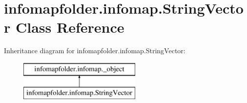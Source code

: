 \hypertarget{classinfomapfolder_1_1infomap_1_1StringVector}{}\section{infomapfolder.\+infomap.\+String\+Vector Class Reference}
\label{classinfomapfolder_1_1infomap_1_1StringVector}
Inheritance diagram for infomapfolder.\+infomap.\+String\+Vector\+:\begin{figure}[H]
\begin{center}
\leavevmode
\includegraphics[height=2.000000cm]{classinfomapfolder_1_1infomap_1_1StringVector}
\end{center}
\end{figure}
